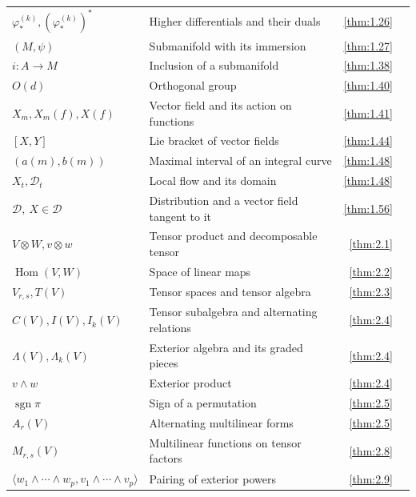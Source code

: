 {\begin{longtable}{@{}>{\raggedright\arraybackslash}p{.39\linewidth}>{\raggedright\arraybackslash}p{.39\linewidth}r r@{}}
$\varphi_*^{(k)},\allowbreak  (\varphi_*^{(k)})^{*}$ & Higher differentials and their duals & \ref{thm:1.26} & \pageref{thm:1.26} \\
$(M,\allowbreak \psi)$ & Submanifold with its immersion & \ref{thm:1.27} & \pageref{thm:1.27} \\
$i:A\to M$ & Inclusion of a submanifold & \ref{thm:1.38} & \pageref{thm:1.38} \\
$O(d)$ & Orthogonal group & \ref{thm:1.40} & \pageref{thm:1.40} \\
$X_{m},\allowbreak  X_{m}(f),\allowbreak  X(f)$ & Vector field and its action on functions & \ref{thm:1.41} & \pageref{thm:1.41} \\
$[X,\allowbreak Y]$ & Lie bracket of vector fields & \ref{thm:1.44} & \pageref{thm:1.44} \\
$(a(m),\allowbreak b(m))$ & Maximal interval of an integral curve & \ref{thm:1.48} & \pageref{thm:1.48} \\
$X_t,\allowbreak \mathcal D_t$ & Local flow and its domain & \ref{thm:1.48} & \pageref{thm:1.48} \\
$\mathcal D,\allowbreak \ X\in\mathcal D$ & Distribution and a vector field tangent to it & \ref{thm:1.56} & \pageref{thm:1.56} \\
$V\otimes W,\allowbreak  v\otimes w$ & Tensor product and decomposable tensor & \ref{thm:2.1} & \pageref{thm:2.1} \\
$\operatorname{Hom}(V,\allowbreak W)$ & Space of linear maps & \ref{thm:2.2} & \pageref{thm:2.2} \\
$V_{r,\allowbreak s},\allowbreak  T(V)$ & Tensor spaces and tensor algebra & \ref{thm:2.3} & \pageref{thm:2.3} \\
$C(V),\allowbreak  I(V),\allowbreak  I_{k}(V)$ & Tensor subalgebra and alternating relations & \ref{thm:2.4} & \pageref{thm:2.4} \\
$\Lambda(V),\allowbreak  \Lambda_{k}(V)$ & Exterior algebra and its graded pieces & \ref{thm:2.4} & \pageref{thm:2.4} \\
$v\wedge w$ & Exterior product & \ref{thm:2.4} & \pageref{thm:2.4} \\
$\operatorname{sgn}\pi$ & Sign of a permutation & \ref{thm:2.5} & \pageref{thm:2.5} \\
$A_{r}(V)$ & Alternating multilinear forms & \ref{thm:2.5} & \pageref{thm:2.5} \\
$M_{r,\allowbreak s}(V)$ & Multilinear functions on tensor factors & \ref{thm:2.8} & \pageref{thm:2.8} \\
$\langle w_{1}\wedge\cdots\wedge w_{p},\allowbreak v_{1}\wedge\cdots\wedge v_{p}\rangle$ & Pairing of exterior powers & \ref{thm:2.9} & \pageref{thm:2.9} \\

\end{longtable}}
